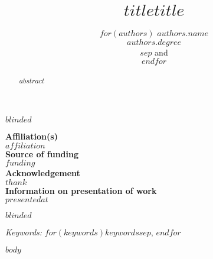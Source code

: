 \documentclass[12pt]{article}
\newcommand{\blind}{$blinded$}
\begin{document}
\def\spacingset#1{\renewcommand{\baselinestretch}%
{#1}\small\normalsize} \spacingset{1}



\blind
{
  \title{\bf $title$}

  \author{
    $for(authors)$
    $authors.name$\\ %
    $authors.degree$\\
    $sep$ and \\ $endfor$
  }
    \maketitle
  \bigskip
  \begin{center}
  {
  \textbf{Affiliation(s)}\\
  $affiliation$\\
  \bigskip
  \textbf{Source of funding}\\
  $funding$\\
  \bigskip
  \textbf{Acknowledgement}\\
  $thank$\\
  \bigskip
  \textbf{Information on presentation of work}\\
  $presentedat$
  }
  \end{center}

} \fi


\newpage

\blind
{
  \bigskip
  \bigskip
  \bigskip
  \begin{center}
  \title{\LARGE\bf $title$}
  \end{center}
  \bigskip
  \maketitle
} \fi


\bigskip
\begin{abstract}
$abstract$
\end{abstract}

\noindent%
{\it Keywords:} $for(keywords)$$keywords$$sep$, $endfor$
\vfill

\newpage
\spacingset{1.45} %

$body$



\end{document}
